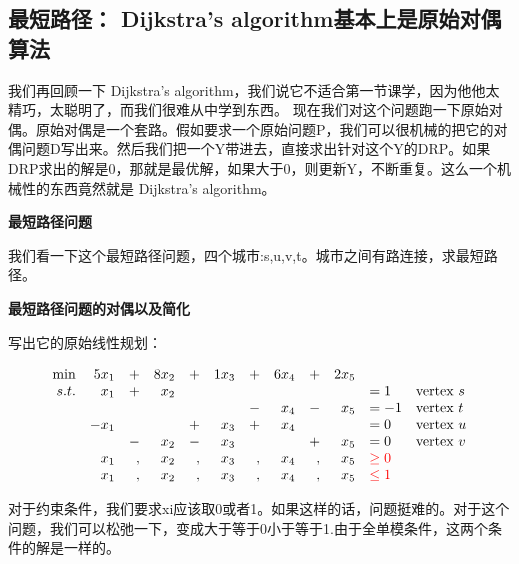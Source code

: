 \documentclass[11pt]{article}
\begin{document}
\begin{CJK}{UTF8}{gbsn}
\subsection{最短路径： Dijkstra's algorithm基本上是原始对偶算法}
我们再回顾一下 Dijkstra's algorithm，我们说它不适合第一节课学，因为他他太精巧，太聪明了，而我们很难从中学到东西。
现在我们对这个问题跑一下原始对偶。原始对偶是一个套路。假如要求一个原始问题P，我们可以很机械的把它的对偶问题D写出来。然后我们把一个Y带进去，直接求出针对这个Y的DRP。如果DRP求出的解是0，那就是最优解，如果大于0，则更新Y，不断重复。这么一个机械性的东西竟然就是 Dijkstra's algorithm。


\textbf{最短路径问题}

我们看一下这个最短路径问题，四个城市:s,u,v,t。城市之间有路连接，求最短路径。
\begin{figure}[H]
\end{figure}


\textbf{最短路径问题的对偶以及简化}

写出它的原始线性规划：
\begin{small}
\[
\begin{array}{rrrrrrrrrrll}
 \min &5 x_1   &+&  8 x_2   &+& 1 x_3   &+& 6 x_4   &+& 2 x_5 & \\
 s.t. & x_1 &+&  x_2 & &  & &   & & & = 1    & \text{vertex } s \\
      &     & &      & &  &-&   x_4  &-& x_5 & = -1 &\text{vertex } t  \\
      &  -x_1& &     &+& x_3 &+& x_4  & & & =  0  &\text{vertex } u \\
      &      &-& x_2 &-& x_3 & &      &+&x_5 & =  0 &\text{vertex } v  \\
      &   x_1 &,&     x_2 &,&    x_3  &,&    x_4  &,& x_5 & \textcolor{red}{\geq 0} \\
       &   x_1 &,&     x_2 &,&    x_3  &,&    x_4  &,& x_5 & \textcolor{red}{\leq 1} 	
\end{array} \nonumber
\]
\end{small}
对于约束条件，我们要求xi应该取0或者1。如果这样的话，问题挺难的。对于这个问题，我们可以松弛一下，变成大于等于0小于等于1.由于全单模条件，这两个条件的解是一样的。


\end{CJK}
\end{document}
